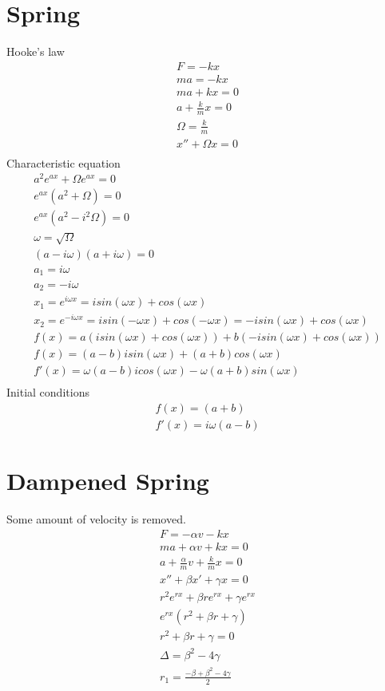 \documentclass{article}
\begin{document}
\section*{Spring}
Hooke's law
\begin{gather}
F = -kx \\
ma = -kx \\
ma + kx = 0 \\
a + \frac{k}{m}x = 0 \\
\Omega = \frac{k}{m} \\
x'' +\Omega x = 0 \\ 
\end{gather}
Characteristic equation
\begin{gather}
a^2e^{ax} + \Omega e^{ax} = 0 \\
e^{ax}(a^2 + \Omega) = 0 \\
e^{ax}(a^2 - i^2\Omega) = 0 \\
\omega = \sqrt{\Omega} \\
(a - i \omega)(a +  i \omega) = 0 \\
a_1 = i \omega \\
a_2 = -i \omega \\
x_1 = e^{i \omega x} = i sin(\omega x) + cos(\omega x) \\
x_2 = e^{-i \omega x} =  i sin(-\omega x) + cos(-\omega x) = -i sin(\omega x) + cos(\omega x) \\
f(x) = a(i sin(\omega x) + cos(\omega x) ) +  b(-i sin(\omega x) + cos(\omega x)) \\
f(x) = (a - b)i sin(\omega x) + (a + b)cos(\omega x) \\ 
f'(x) = \omega(a - b)i cos(\omega x) - \omega(a + b)sin(\omega x) \\
\end{gather}
Initial conditions
\begin{gather}
f(x) = (a + b) \\
f'(x) = i\omega(a - b)
\end{gather}
\section*{Dampened Spring}
Some amount of velocity is removed.
\begin{gather}
F = -\alpha v -kx \\
ma + \alpha v + kx = 0 \\
a + \frac{\alpha}{m} v + \frac{k}{m}x = 0 \\
x'' + \beta x' + \gamma x = 0 \\ 
r^2 e^{rx} + \beta r e^{rx} + \gamma e^{rx} \\
e^{rx}(r^2 + \beta r + \gamma) \\ 
r^2 + \beta r + \gamma = 0 \\
\Delta = \beta^2 - 4 \gamma \\
r_1 = \frac{-\beta + \beta^2 - 4 \gamma}{2}
\end{gather}
\end{document}
